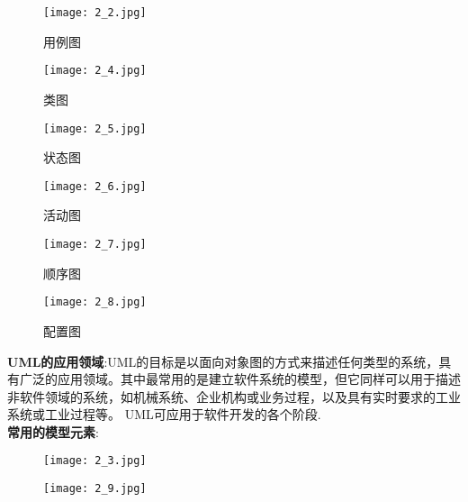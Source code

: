 \documentclass[../main.tex]{subfiles}
\begin{document}
\begin{figure}[H]
  \begin{minipage}{0.5\linewidth}
    \centering
    \texttt{[image: 2\_2.jpg]}
    \caption{用例图}
  \end{minipage}
  \begin{minipage}{0.5\linewidth}
    \centering
    \texttt{[image: 2\_4.jpg]}
    \caption{类图}
  \end{minipage}
\end{figure}
\begin{figure}[H]
  \begin{minipage}{0.5\linewidth}
    \centering
    \texttt{[image: 2\_5.jpg]}
    \caption{状态图}
  \end{minipage}
  \begin{minipage}{0.5\linewidth}
    \centering
    \texttt{[image: 2\_6.jpg]}
    \caption{活动图}
  \end{minipage}
\end{figure}
\begin{figure}[H]
  \begin{minipage}{0.5\linewidth}
    \centering
    \texttt{[image: 2\_7.jpg]}
    \caption{顺序图}
  \end{minipage}
  \begin{minipage}{0.5\linewidth}
    \centering
    \texttt{[image: 2\_8.jpg]}
    \caption{配置图}
  \end{minipage}
\end{figure}
\textbf{UML的应用领域}:UML的目标是以面向对象图的方式来描述任何类型的系统，具有广泛的应用领域。其中最常用的是建立软件系统的模型，但它同样可以用于描述非软件领域的系统，如机械系统、企业机构或业务过程，以及具有实时要求的工业系统或工业过程等。
UML可应用于软件开发的各个阶段.\\
\textbf{常用的模型元素}:
\begin{figure}[H]
  \centering
  \texttt{[image: 2\_3.jpg]}
\end{figure}
\begin{figure}[H]
  \centering
  \texttt{[image: 2\_9.jpg]}
\end{figure}
\end{document}

